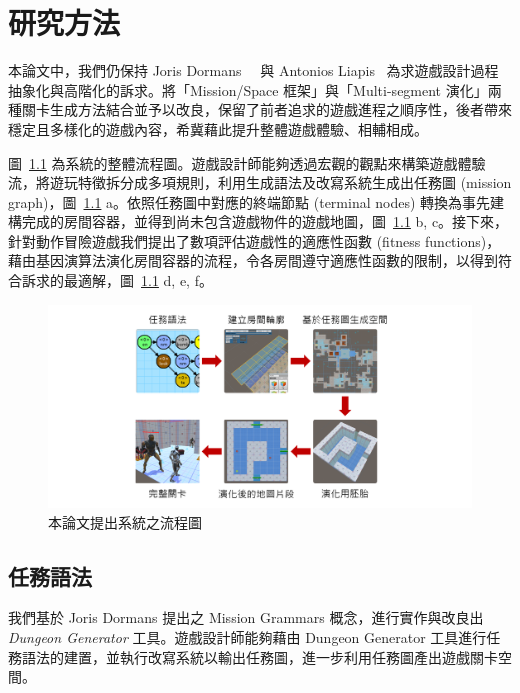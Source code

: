 \chapter{研究方法}
\label{cha:methodology}

本論文中，我們仍保持 Joris Dormans~\cite{dormans2010adventures}~\cite{dormans2012engineering} 與 Antonios Liapis~\cite{liapis2013generating} 為求遊戲設計過程抽象化與高階化的訴求。將「Mission/Space 框架」與「Multi-segment 演化」兩種關卡生成方法結合並予以改良，保留了前者追求的遊戲進程之順序性，後者帶來穩定且多樣化的遊戲內容，希冀藉此提升整體遊戲體驗、相輔相成。

圖~\ref{fig:system-framework} 為系統的整體流程圖。遊戲設計師能夠透過宏觀的觀點來構築遊戲體驗流，將遊玩特徵拆分成多項規則，利用生成語法及改寫系統生成出任務圖 (mission graph)，圖~\ref{fig:system-framework} a。依照任務圖中對應的終端節點 (terminal nodes) 轉換為事先建構完成的房間容器，並得到尚未包含遊戲物件的遊戲地圖，圖~\ref{fig:system-framework} b, c。接下來，針對動作冒險遊戲我們提出了數項評估遊戲性的適應性函數 (fitness functions)，藉由基因演算法演化房間容器的流程，令各房間遵守適應性函數的限制，以得到符合訴求的最適解，圖~\ref{fig:system-framework} d, e, f。

\begin{figure}[ht]
  \begin{center}
    \includegraphics[width=1.0\textwidth]{figures/系統框架.png}
    \caption{本論文提出系統之流程圖} 
    \label{fig:system-framework}
  \end{center}
\end{figure}

\section{任務語法}
\label{sec:method-missiongrammars}

我們基於 Joris Dormans 提出之 Mission Grammars 概念，進行實作與改良出 \textit{Dungeon Generator} 工具。遊戲設計師能夠藉由 Dungeon Generator 工具進行任務語法的建置，並執行改寫系統以輸出任務圖，進一步利用任務圖產出遊戲關卡空間。


